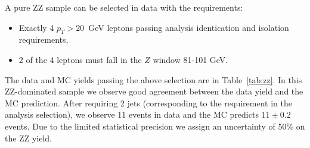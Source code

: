 A pure ZZ sample can be selected in data with the requirements:

\begin{itemize}
\item Exactly 4 $p_T>20$~GeV leptons passing analysis identication and isolation requirements,
\item 2 of the 4 leptons must fall in the $Z$ window 81-101 GeV.
\end{itemize}

The data and MC yields passing the above selection are in Table~\ref{tab:zz}. 
In this ZZ-dominated sample we observe good agreement between the data yield and the MC prediction.
After requiring 2 jets (corresponding to the requirement in the analysis selection), we observe 11 events
in data and the MC predicts $11\pm0.2$ events. Due to the limited statistical precision we assign an uncertainty
of 50\% on the ZZ yield.

